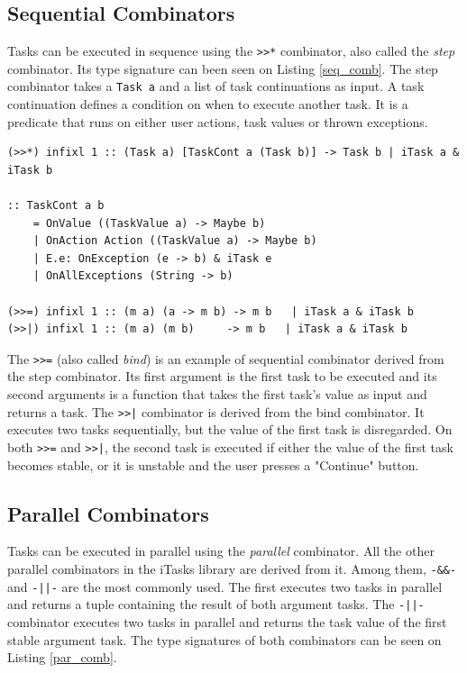 \subsection{Sequential Combinators}

Tasks can be executed in sequence using the \texttt{>>*} combinator, also called the \textit{step} combinator. Its type signature can been seen on Listing \ref{seq_comb}. The step combinator takes a \texttt{Task a} and a list of task continuations as input. A task continuation defines a condition on when to execute another task. It is a predicate that runs on either user actions, task values or thrown exceptions.

\begin{lstlisting}[caption=Sequential combinators,label=seq_comb,captionpos=b]
(>>*) infixl 1 :: (Task a) [TaskCont a (Task b)] -> Task b | iTask a & iTask b

:: TaskCont a b                               
	= OnValue ((TaskValue a) -> Maybe b)         
	| OnAction Action ((TaskValue a) -> Maybe b) 
	| E.e: OnException (e -> b) & iTask e        
	| OnAllExceptions (String -> b)

(>>=) infixl 1 :: (m a) (a -> m b) -> m b   | iTask a & iTask b
(>>|) infixl 1 :: (m a) (m b)     -> m b   | iTask a & iTask b
\end{lstlisting}

The \texttt{>>=} (also called \textit{bind}) is an example of sequential combinator derived from the step combinator. Its first argument is the first task to be executed and its second arguments is a function that takes the first task's value as input and returns a task. The \texttt{>>|} combinator is derived from the bind combinator. It executes two tasks sequentially, but the value of the first task is disregarded. On both \texttt{>>=} and \texttt{>>|}, the second task is executed if either the value of the first task becomes stable, or it is unstable and the user presses a "Continue" button.

\subsection{Parallel Combinators}

Tasks can be executed in parallel using the \textit{parallel} combinator. All the other parallel combinators in the iTasks library are derived from it. Among them, \texttt{-\&\&-} and  \texttt{-||-} are the most commonly used. The first executes two tasks in parallel and returns a tuple containing the result of both argument tasks. The \texttt{-||-} combinator executes two tasks in parallel and returns the task value of the first stable argument task. The type signatures of both combinators can be seen on Listing \ref{par_comb}.


